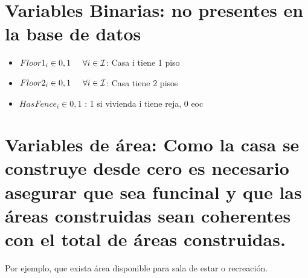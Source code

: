\section{Variables Binarias: no presentes en la base de datos}
\begin{itemize}
    \item $Floor1_{i} \in {0,1} \hspace{5mm} \forall i \in \mathcal{I}$: Casa i tiene 1 piso
    \item $Floor2_{i} \in 0,1 \hspace{5mm} \forall i \in \mathcal{I}$: Casa tiene 2 pisos
    \item $HasFence_{i} \in 0,1$ : 1 si vivienda i tiene reja, 0 eoc
\end{itemize}
\section{Variables de área: Como la casa se construye desde cero es necesario asegurar que sea funcinal y que las áreas construidas sean coherentes con el total de áreas construidas.}
Por ejemplo, que exista área disponible para sala de estar o recreación.
